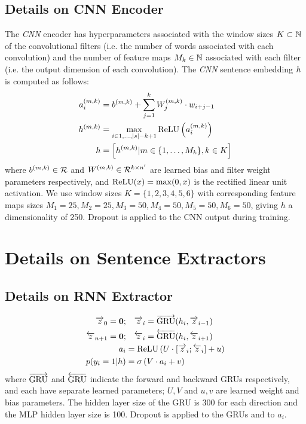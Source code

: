 \subsection{Details on CNN Encoder} \label{app:cnnencoder}
The \textit{CNN} encoder has hyperparameters
associated with the window sizes $K \subset \mathbb{N}$ of the convolutional filters
(i.e. the number of words associated with each convolution) and the number of 
feature maps $M_k \in \mathbb{N}$ associated with each filter
(i.e. the output dimension of each 
convolution). 
The \textit{CNN} sentence embedding $\sentEmb$ is computed as follows:
\begin{align}
 \specActivation_i &= \specConvBias 
    + \sum^\filterWindowSize_{j=1} \specConvWeight_j \cdot \wemb_{i + j -1}\\
  \specFeatureMap &= \max_{i\in 1,\dots, |\sent| - \filterWindowSize + 1} 
                      \relu\left(\specActivation_i\right) \\
 \sentEmb &= \left[\specFeatureMap | 
   \numFeatureMaps \in \{1, \ldots, \maxFeatureMaps_k\},
   \filterWindowSize \in \maxWindowSize
   \right]
\end{align}
where $b^{(m,k)}\in\mathcal{R}$ and $W^{(m,k)} \in 
\mathcal{R}^{k \times {n^\prime}}$ are learned bias and filter
weight parameters respectively, and $\operatorname{ReLU}(x) = \max(0, x)$ is the rectified
linear unit activation.
We use window sizes $K=\{1, 2, 3, 4, 5, 6\}$ with corresponding feature maps sizes $M_1=25, M_2=25, M_3=50, M_4=50, M_5=50, M_6=50$, giving $h$ a dimensionality of 250. 
Dropout is applied to the CNN output during training.

\section{Details on Sentence Extractors} \label{app:sentextractors}
\subsection{Details on RNN Extractor} \label{app:rnnextractor}
\begin{align}
    \rExtHidden_0 = \mathbf{0};&\quad   \rExtHidden_i = \rgru(\sentEmb[i], \rExtHidden_{i-1}) \\
    \lExtHidden_{\docSize + 1} = \mathbf{0};&\quad    \lExtHidden_i = \lgru(\sentEmb[i], \lExtHidden_{i+1}) \\
   \logits_i &= \relu\left(U \cdot [\rExtHidden_i; \lExtHidden_i] + u \right)\\
   p(\slabel_i=1|\sentvec) &= \sigma\left(V\cdot \logits_i + v  \right)
\end{align}
where $\overrightarrow{\operatorname{GRU}}$ and $\overleftarrow{\operatorname{GRU}}$ indicate the 
forward and backward GRUs respectively, and each have separate learned 
parameters; $U, V$ and $u, v$ are learned weight and bias parameters.
The hidden layer size of the GRU is 300 for each direction and the MLP hidden layer
size is 100. Dropout is applied to the GRUs and to $a_i$.

